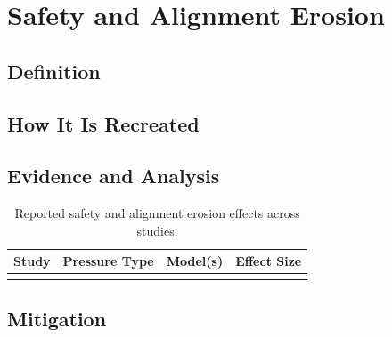 \section{Safety and Alignment Erosion}
\label{sec:safety_erosion}

\subsection{Definition}
\label{sec:safety_erosion_definition}

\subsection{How It Is Recreated}
\label{sec:safety_erosion_elicitation}

\subsection{Evidence and Analysis}
\label{sec:safety_erosion_evidence}

\begin{table}[t]
\centering
\caption{Reported safety and alignment erosion effects across studies.}
\label{tab:safety_erosion_evidence}
\begin{tabular}{llll}
\toprule
\textbf{Study} & \textbf{Pressure Type} & \textbf{Model(s)} & \textbf{Effect Size} \\
\midrule
 & & & \\
\bottomrule
\end{tabular}
\end{table}

\subsection{Mitigation}
\label{sec:safety_erosion_mitigation}
